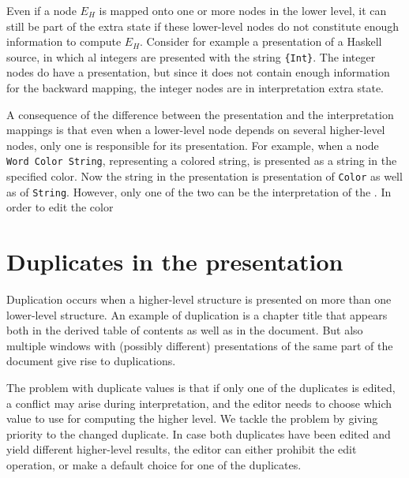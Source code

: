 \bc
Even if a node $E_H$ is mapped onto one or more nodes in the lower level, it can still be part of the extra state if these lower-level nodes do not constitute enough information to compute $E_H$. Consider for example a presentation of a Haskell source, in which al integers are presented with the string \verb|{Int}|. The integer nodes do have a presentation, but since it does not contain enough information for the backward mapping, the integer nodes are in interpretation extra state.  
\ec


\bc
A consequence of the difference between the presentation and the interpretation mappings is that even when a lower-level node depends on several higher-level nodes, only one is responsible for its presentation. For example, when a node \verb|Word Color String|, representing a colored string, is presented as a string in the specified color. Now the string in the presentation is presentation of \verb|Color| as well as of \verb|String|. However, only one of the two can be the interpretation of the . In order to edit the color
\ec











%																
%																
%																
\section{Duplicates in the presentation} \label{sect:informalDuplicates}


Duplication occurs when a higher-level structure is presented on more than one lower-level structure. An example of duplication is a chapter title that appears both in the derived table of contents as well as in the document. But also multiple windows with (possibly different) presentations of the same part of the document give rise to duplications. 

The problem with duplicate values is that if only one of the duplicates is edited, a conflict may arise during interpretation, and the editor needs to choose which value to use for computing the higher level. We tackle the problem by giving priority to the changed duplicate. In case both duplicates have been edited and yield different higher-level results, the editor can either prohibit the edit operation, or make a default choice for one of the duplicates.

